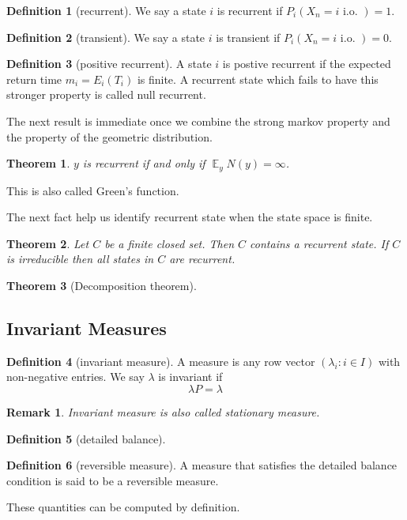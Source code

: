 \documentclass{article}
\newtheorem{Thm}{Theorem}[section]
\newtheorem*{Rk}{Remark}
\theoremstyle{definition}
\newtheorem{Def}{Definition}[section]
\newcommand{\EE}{\operatorname{\mathbb{E}}}
\newcommand{\<}{\left\langle}
\renewcommand{\>}{\right\rangle}
\begin{document}
\begin{Def}[recurrent]
    We say a state $i$ is recurrent if $P_i(X_n=i\text{ i.o. })=1$.
\end{Def}
\begin{Def}[transient]
    We say a state $i$ is transient if $P_i(X_n=i\text{ i.o. })=0$.
\end{Def}
\begin{Def}[positive recurrent]
    A state $i$ is postive recurrent if the expected return time $m_i=E_i(T_i)$ is finite.
    A recurrent state which fails to have this stronger property is called null recurrent.
\end{Def}
The next result is immediate once we combine the strong markov property and the property of the geometric distribution.
\begin{Thm}
    $y$ is recurrent if and only if $\EE_yN(y)=\infty$.
\end{Thm}
This is also called Green's function.

The next fact help us identify recurrent state when the state space is finite.
\begin{Thm}
    Let $C$ be a finite closed set. Then $C$ contains a recurrent state. If $C$ is irreducible then all states in $C$ are recurrent.
\end{Thm}

\begin{Thm}[Decomposition theorem]
    
\end{Thm}

\subsection{Invariant Measures}

\begin{Def}[invariant measure]
    A measure is any row vector $(\lambda_i:i\in I)$ with non-negative entries. We say $\lambda$ is invariant if \[\lambda P=\lambda\]
\end{Def}
\begin{Rk}
    Invariant measure is also called stationary measure.
\end{Rk}

\begin{Def}[detailed balance]
    
\end{Def}
\begin{Def}[reversible measure]
    A measure that satisfies the detailed balance condition is said to be a reversible measure.
\end{Def}
These quantities can be computed by definition.
\end{document}
